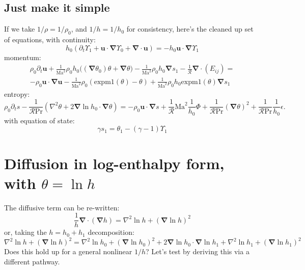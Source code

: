 \documentclass{aastex631}
\newcommand{\del}{\nabla}
\renewcommand{\vec}{\boldsymbol}
\newcommand{\grad}{\vec{\del}}
\newcommand{\scrR}{\mathcal{R}}
\newcommand{\Ma}{\mathrm{Ma}}
\renewcommand{\Pr}{\mathrm{Pr}}
\newcommand{\expm}{\mathrm{expm1}}
\begin{document}
\subsection{Just make it simple}
If we take $1/\rho = 1/\rho_0$, and $1/h = 1/h_0$ for consistency, here's the cleaned up set of equations, with continuity:
\begin{equation}
    h_0 \left(\partial_t \Upsilon_1 + \vec{u}\cdot\grad \Upsilon_0 + \grad \cdot \vec{u}\right) = - h_0 \vec{u}\cdot\grad \Upsilon_1
\end{equation}
momentum:
\begin{multline}
  \rho_0 \partial_t \vec{u}
  + \frac{1}{\Ma^2}\rho_0 h_0 \Bigg((\grad \theta_0)\theta  + \grad \theta \Bigg)
  - \frac{1}{\Ma^2} \rho_0 h_0 \grad s_1
  - \frac{1}{\scrR}\grad \cdot (E_{ij})
  = \\
  -\rho_0 \vec{u}\cdot\grad\vec{u}
  -\frac{1}{\Ma^2} \rho_0 \left(\expm(\theta)-\theta\right)
  + \frac{1}{\Ma^2} \rho_0 h_0 \expm(\theta) \grad s_1
\end{multline}
entropy:
\begin{equation}
  \rho_0 \partial_t s
  - \frac{1}{\scrR \Pr}\left(\nabla^2 \theta + 2 \grad \ln h_0 \cdot \grad \theta \right)
  =
  - \rho_0 \vec{u}\cdot\grad s
  + \frac{1}{\scrR} \Ma^2  \frac{1}{h_0} \Phi
  + \frac{1}{\scrR \Pr} (\grad \theta)^2
  + \frac{1}{\scrR \Pr} \frac{1}{h_0} \epsilon.
\end{equation}
with equation of state:
\begin{equation}
  \gamma s_1 = \theta_1 - (\gamma - 1)\Upsilon_1
\end{equation}


\newpage
\appendix
\section{Diffusion in log-enthalpy form, with $\theta = \ln h$}
\label{sec:log enthalpy diffusion}
The diffusive term can be re-written:
\begin{equation}
  \frac{1}{h}\grad\cdot(\grad h) = \nabla^2 \ln h + (\grad \ln h)^2
\end{equation}
or, taking the $h = h_0 + h_1$ decomposition:
\begin{equation}
  \nabla^2 \ln h + (\grad \ln h)^2 = \nabla^2 \ln h_0 + (\grad \ln h_0)^2 + 2\grad \ln h_0 \cdot \grad \ln h_1 + \nabla^2 \ln h_1 + (\grad \ln h_1)^2
\end{equation}
Does this hold up for a general nonlinear $1/h$?  Let's test by deriving this via a different pathway.
\end{document}
